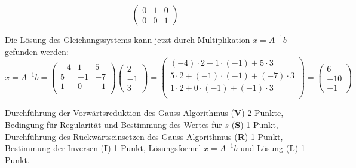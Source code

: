 \begin{loesung}
\begin{teilaufgaben}
\[\begin{pmatrix}
0& 1 & 0 \\
0&0& 1
\end{pmatrix}
\]
\item Die Lösung des Gleichungssystems kann jetzt durch Multiplikation $x=A^{-1}b$
gefunden werden:
\[
 x = A^{-1}b = 
 \begin{pmatrix}
-4 & 1 & 5 \\
5 & -1 & -7\\
1 & 0 & -1 \\
\end{pmatrix}
\begin{pmatrix}
2\\ -1\\ 3
\end{pmatrix}
= 
\begin{pmatrix}
(-4)\cdot2 + 1\cdot (-1) + 5\cdot 3\\ 
5\cdot2 + (-1)\cdot (-1) + (-7)\cdot 3\\ 
1\cdot2 + 0\cdot (-1) + (-1)\cdot 3\\ 
\end{pmatrix}
=
\begin{pmatrix}
6\\ -10\\ -1
\end{pmatrix}
\]
\end{teilaufgaben}
\end{loesung}

\begin{bewertung}
Durchführung der Vorwärtsreduktion des Gauss-Algorithmus ({\bf V}) 2 Punkte,
Bedingung für Regularität und Bestimmung des Wertes für $s$ ({\bf S}) 1 Punkt,
Durchführung des Rückwärtseinsetzen des Gauss-Algorithmus ({\bf R}) 1 Punkt,
Bestimmung der Inversen ({\bf I}) 1 Punkt,
Lösungsformel $x=A^{-1}b$ und Lösung ({\bf L}) 1 Punkt.
\end{bewertung}


